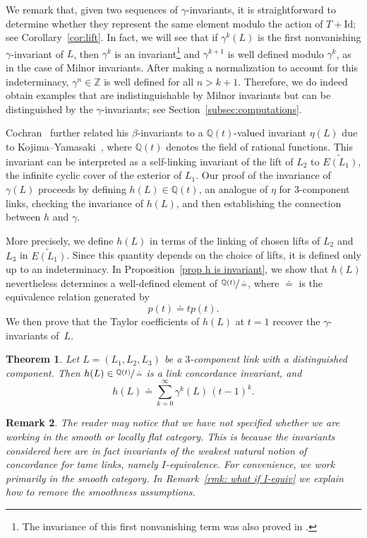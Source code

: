 \documentclass[a4paper, 11pt]{amsart}
\newtheorem{theorem}{Theorem}[section]
\newtheorem{remark}[theorem]{Remark}
\theoremstyle{definition}
\newcommand{\Q}{\mathbb{Q}}
\newcommand{\Z}{\mathbb{Z}}
\newcommand{\noteta}{h}
\begin{document}
We remark that, given two sequences of $\gamma$-invariants, it is straightforward to determine whether they represent the same element modulo the action of $T+\mathrm{Id}$; see Corollary~\ref{cor:lift}. In fact, we will see that if $\gamma^k(L)$ is the first nonvanishing $\gamma$-invariant of $L$, then $\gamma^k$ is an invariant\footnote{The invariance of this first nonvanishing term was also proved in \cite[Corollary~1.5]{Tsukamoto-Yasuhara:2007}.} and $\gamma^{k+1}$ is well defined modulo $\gamma^k$, as in the case of Milnor invariants. After making a normalization to account for this indeterminacy, $\gamma^n\in \Z$ is well defined for all $n>k+1$. Therefore, we do indeed obtain examples that are indistinguishable by Milnor invariants but can be distinguished by the $\gamma$-invariants; see Section~\ref{subsec:computations}.

Cochran~\cite{C3} further related his $\beta$-invariants to a $\Q(t)$-valued invariant $\eta(L)$ due to
Kojima--Yamasaki~\cite{KojYam79}, where $\Q(t)$ denotes the field of rational functions. This invariant
can be interpreted as a self-linking invariant of the lift of $L_2$ to $\widetilde{E(L_1)}$, the infinite
cyclic cover of the exterior of $L_1$. Our proof of the invariance of $\gamma(L)$ proceeds by defining
$\noteta(L)\in \Q(t)$, an analogue of $\eta$ for $3$-component links, checking the invariance of  $\noteta(L)$, and then establishing the connection between $\noteta$ and $\gamma$.

More precisely, we define $\noteta(L)$ in terms of the linking of chosen lifts of $L_2$ and $L_3$ in $\widetilde{E(L_1)}$. Since this quantity depends on the choice of lifts, it is defined only up to an indeterminacy. In Proposition~\ref{prop h is invariant}, we show that $\noteta(L)$ nevertheless determines a well-defined element of $\sfrac{\Q(t)}{\doteq}$, where $\doteq$ is the equivalence relation generated by
\[
p(t)\doteq t p(t).
\]
We then prove that the Taylor coefficients of $\noteta(L)$ at $t=1$ recover the $\gamma$-invariants of~$L$.

\begin{theorem}\label{thm: gamma as h}
Let $L=(L_1,L_2,L_3)$ be a $3$-component link with a distinguished component. Then $\noteta(L)\in \sfrac{\Q(t)}{\doteq}$ is a link concordance invariant, and
\[
\noteta(L)\doteq \sum_{k=0}^\infty \gamma^k(L)\,(t-1)^k.
\]
\end{theorem}



\begin{remark}\label{rmk:iequiv}
The reader may notice that we have not specified whether we are working in the smooth or  locally flat category. This is because the invariants considered here are in fact invariants of the weakest natural notion of concordance for tame links, namely $I$-equivalence. For convenience, we work primarily in the smooth category.  In Remark~\ref{rmk: what if I-equiv} we explain how to remove the smoothness assumptions.
\end{remark}
\end{document}
